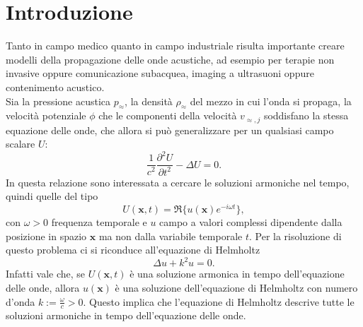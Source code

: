 \documentclass[a4paper]{article}
\theoremstyle{definition}
\theoremstyle{plain}
\theoremstyle{remark}
\begin{document}
	\section*{Introduzione}
	{ 
	Tanto in campo medico quanto in campo industriale risulta importante creare modelli della propagazione delle onde acustiche, ad esempio per terapie non invasive oppure comunicazione subacquea, imaging a ultrasuoni oppure contenimento acustico. \\
	Sia la pressione acustica $p_\approx$, la densità $\rho_\approx$ del mezzo in cui l'onda si propaga, la velocità potenziale $\phi$ che le componenti della velocità $v_{\approx,j}$ soddisfano la stessa equazione delle onde, che allora si può generalizzare per un qualsiasi campo scalare $U$:
	\begin{equation*}
		\frac{1}{c^2} \frac{\partial^2 U}{\partial t^2} - \Delta U = 0.
	\end{equation*}
	In questa relazione sono interessata a cercare le soluzioni armoniche nel tempo, quindi quelle del tipo
	\begin{equation*}
		U(\textbf{x},t) = \Re \{ u(\textbf{x}) e^{-i \omega t} \},
	\end{equation*}
	con $\omega>0$ frequenza temporale e $u$ campo a valori complessi dipendente dalla posizione in spazio $\textbf{x}$ ma non dalla variabile temporale $t$. 
	Per la risoluzione di questo problema ci si riconduce all'equazione di Helmholtz
	\begin{equation*}
		\Delta u + k^2 u = 0.
	\end{equation*}
	Infatti vale che, se $U(\textbf{x},t)$ è una soluzione armonica in tempo dell'equazione delle onde, allora $u(\textbf{x})$ è una soluzione dell'equazione di Helmholtz con numero d'onda $k:=\frac{\omega}{c}>0$. Questo implica che l'equazione di Helmholtz descrive tutte le soluzioni armoniche in tempo dell'equazione delle onde.\\
	
}
\end{document}
